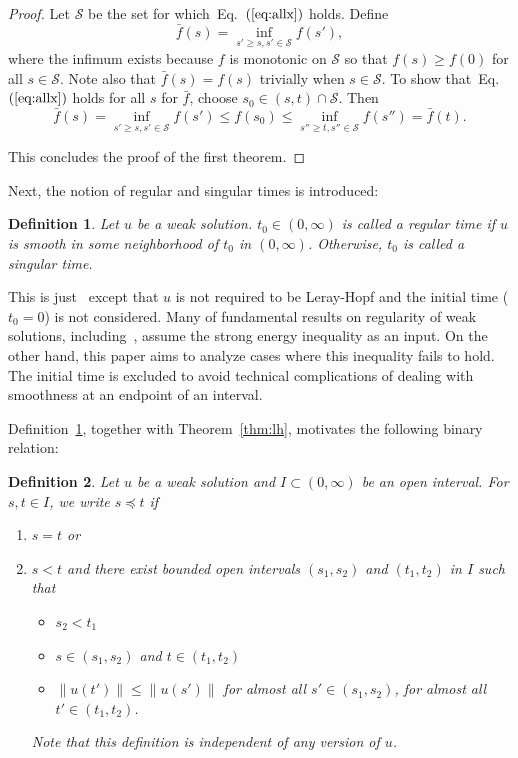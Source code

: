 \documentclass{article}
\newtheorem{definition}{Definition}
\def\eq#1{Eq.~$(\ref{#1})$}
\def\S{{\mathcal{S}}}
\begin{document}
\begin{proof}
Let $\S$ be the set for which~\eq{eq:allx} holds. Define
\begin{equation*}
    \bar f(s) = \inf_{s' \geq s, s' \in \S} f(s'),
\end{equation*}
  where the infimum exists because $f$ is monotonic on $\S$ so that $f(s) \geq f(0)$ for all $s \in \S$. Note also that $\bar f(s) = f(s)$ trivially when $s\in \S$.
  To show that~\eq{eq:allx} holds for all $s$ for $\bar f$, 
  choose $s_0\in(s,t)\cap\S$. Then
  \begin{equation*}
    \bar f(s)= \inf_{s' \geq s, s' \in \S} f(s') \leq f(s_0)
    \leq \inf_{s'' \geq t, s'' \in \S} f(s'')=\bar f(t). 
  \end{equation*}


  This concludes the proof of the first theorem.
\end{proof}

Next, the notion of regular and singular times is introduced:
\begin{definition}
\label{regsin}
    Let $u$ be a weak solution. $t_0 \in (0,\infty)$ is called a regular time if $u$ is smooth in some neighborhood of $t_0$ in $(0,\infty)$. Otherwise, $t_0$ is called a singular time.
\end{definition}
This is just~\cite[Definition 8.2]{RobRodSad16} except that $u$ is not required to be Leray-Hopf and the initial time ($t_0=0$) is not considered. Many of fundamental results on regularity of weak solutions, including~\cite[Theorem 8.14 and Theorem 8.17]{RobRodSad16}, assume the strong energy inequality as an input. On the other hand, this paper aims to analyze cases where this inequality fails to hold. The initial time is excluded to avoid technical complications of dealing with smoothness at an endpoint of an interval.








Definition~\ref{regsin}, together with Theorem~\ref{thm:lh}, motivates the following binary relation:
\begin{definition}
\label{partial order def}
  Let $u$ be a weak solution and $I \subset (0,\infty)$ be an open interval. For $s,t \in I$, we write $s \preceq t$ if
\begin{enumerate}
    \item $s=t$ or

    \item $s< t$ and  there exist bounded open intervals $(s_1, s_2)$ and $(t_1, t_2)$ in $I$ such that \begin{itemize}
    \item $s_2 < t_1$
      \item $s \in (s_1, s_2)$ and $t \in (t_1, t_2)$
      \item $\lVert u(t') \rVert \leq \lVert u(s') \rVert$ for almost all $s' \in (s_1, s_2)$, for almost all $t' \in (t_1, t_2)$.
  \end{itemize} 
  Note that this definition is independent of any version of $u$.
\end{enumerate}
  
   
 
\end{definition}
\end{document}
